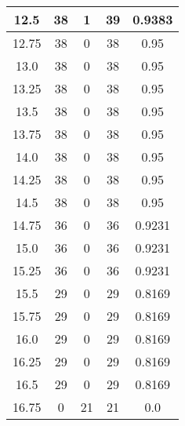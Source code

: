 \documentclass[letterpaper, 12pt]{article}
\begin{document}
\begin{longtable}{|c|c|c|c|c|}
12.5 & 38 & 1 & 39 & 0.9383 \\
\hline
12.75 & 38 & 0 & 38 & 0.95 \\
\hline
13.0 & 38 & 0 & 38 & 0.95 \\
\hline
13.25 & 38 & 0 & 38 & 0.95 \\
\hline
13.5 & 38 & 0 & 38 & 0.95 \\
\hline
13.75 & 38 & 0 & 38 & 0.95 \\
\hline
14.0 & 38 & 0 & 38 & 0.95 \\
\hline
14.25 & 38 & 0 & 38 & 0.95 \\
\hline
14.5 & 38 & 0 & 38 & 0.95 \\
\hline
14.75 & 36 & 0 & 36 & 0.9231 \\
\hline
15.0 & 36 & 0 & 36 & 0.9231 \\
\hline
15.25 & 36 & 0 & 36 & 0.9231 \\
\hline
15.5 & 29 & 0 & 29 & 0.8169 \\
\hline
15.75 & 29 & 0 & 29 & 0.8169 \\
\hline
16.0 & 29 & 0 & 29 & 0.8169 \\
\hline
16.25 & 29 & 0 & 29 & 0.8169 \\
\hline
16.5 & 29 & 0 & 29 & 0.8169 \\
\hline
16.75 & 0 & 21 & 21 & 0.0 \\
\hline
\end{longtable}
\end{document}
